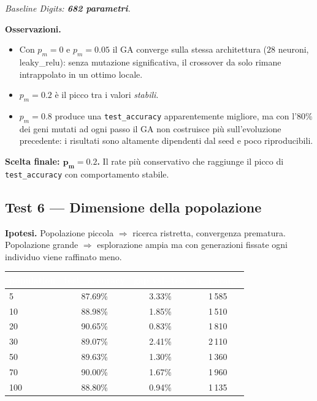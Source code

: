 \documentclass[11pt,a4paper]{article}
\begin{document}
\textit{Baseline Digits: \textbf{682 parametri}.}

\textbf{Osservazioni.}
\begin{itemize}
    \item Con $p_m = 0$ e $p_m = 0.05$ il GA converge sulla stessa
          architettura ($28$ neuroni, leaky\_relu): senza mutazione
          significativa, il crossover da solo rimane intrappolato in un
          ottimo locale.
    \item $p_m = 0.2$ è il picco tra i valori \emph{stabili}.
    \item $p_m = 0.8$ produce una \texttt{test\_accuracy} apparentemente
          migliore, ma con l'$80\%$ dei geni mutati ad ogni passo il GA
          non costruisce più sull'evoluzione precedente: i risultati
          sono altamente dipendenti dal seed e poco riproducibili.
\end{itemize}

\textbf{Scelta finale: $\bm{p_m = 0.2}$.} Il rate più conservativo che
raggiunge il picco di \texttt{test\_accuracy} con comportamento stabile.

\subsection{Test 6 — Dimensione della popolazione}

\textbf{Ipotesi.} Popolazione piccola $\Rightarrow$ ricerca ristretta,
convergenza prematura. Popolazione grande $\Rightarrow$ esplorazione
ampia ma con generazioni fissate ogni individuo viene raffinato meno.

\begin{center}
\begin{tabular}{lccc}
    \toprule
    \rowcolor{headerblue}
    \textcolor{white}{\textbf{population}} &
    \textcolor{white}{\textbf{test\_accuracy}} &
    \textcolor{white}{\textbf{gap val$-$test}} &
    \textcolor{white}{\textbf{n\_params}} \\
    \midrule
    5    & 87.69\%  & 3.33\%  & 1\,585 \\
    \rowcolor{rowgray}
    10   & 88.98\%  & 1.85\%  & 1\,510 \\
    20   & 90.65\%  & 0.83\%  & 1\,810 \\
    \rowcolor{rowgray}
    30   & 89.07\%  & 2.41\%  & 2\,110 \\
    50   & 89.63\%  & 1.30\%  & 1\,360 \\
    \rowcolor{rowgray}
    70   & 90.00\%  & 1.67\%  & 1\,960 \\
    100  & 88.80\%  & 0.94\%  & 1\,135 \\
    \bottomrule
\end{tabular}
\end{center}
\end{document}

